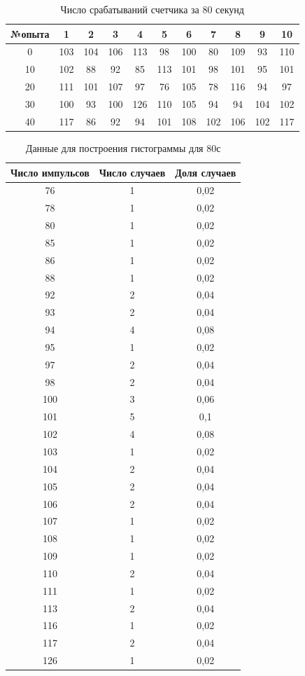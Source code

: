 \documentclass{article}
\begin{document}
\begin{table}[!h]
    \centering
    \begin{tabular}{|c|c|c|c|c|c|c|c|c|c|c|}
        \hline
         №опыта & 1 & 2 & 3 & 4 & 5 & 6 & 7 & 8 & 9 & 10 \\
         \hline
         0 & 103 & 104 & 106 & 113 & 98 & 100 & 80 & 109 & 93 & 110 \\
        10 & 102 & 88 & 92 & 85 & 113 & 101 & 98 & 101 & 95 & 101 \\
        20 & 111 & 101 & 107 & 97 & 76 & 105 & 78 & 116 & 94 & 97 \\
        30 & 100 & 93 & 100 & 126 & 110 & 105 & 94 & 94 & 104 & 102 \\
        40 & 117 & 86 & 92 & 94 & 101 & 108 & 102 & 106 & 102 & 117 \\
        \hline
    \end{tabular}
    \caption{Число срабатываний счетчика за 80 секунд}
\end{table}

\begin{table}[!h]
    \centering
    \begin{tabular}{|c|c|c|}
        \hline
         Число импульсов & Число случаев & Доля случаев \\
         \hline
        76 & 1 & 0,02 \\
        78 & 1 & 0,02 \\
        80 & 1 & 0,02 \\
        85 & 1 & 0,02 \\
        86 & 1 & 0,02 \\
        88 & 1 & 0,02 \\
        92 & 2 & 0,04 \\
        93 & 2 & 0,04 \\
        94 & 4 & 0,08 \\
        95 & 1 & 0,02 \\
        97 & 2 & 0,04 \\
        98 & 2 & 0,04 \\
        100 & 3 & 0,06 \\
        101 & 5 & 0,1 \\
        102 & 4 & 0,08 \\
        103 & 1 & 0,02 \\
        104 & 2 & 0,04 \\
        105 & 2 & 0,04 \\
        106 & 2 & 0,04 \\
        107 & 1 & 0,02 \\
        108 & 1 & 0,02 \\
        109 & 1 & 0,02 \\
        110 & 2 & 0,04 \\
        111 & 1 & 0,02 \\
        113 & 2 & 0,04 \\
        116 & 1 & 0,02 \\
        117 & 2 & 0,04 \\
        126 & 1 & 0,02 \\
        \hline
    \end{tabular}
    \caption{Данные для построения гистограммы для 80с}
\end{table}
\end{document}
